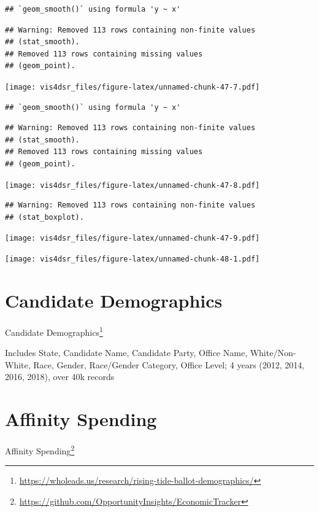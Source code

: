 \documentclass[
]{krantz}
\renewcommand{\href}[2]{#2\footnote{\url{#1}}}
\begin{document}
\begin{verbatim}
## `geom_smooth()` using formula 'y ~ x'
\end{verbatim}

\begin{verbatim}
## Warning: Removed 113 rows containing non-finite values
## (stat_smooth).
## Removed 113 rows containing missing values
## (geom_point).
\end{verbatim}

\texttt{[image: vis4dsr\_files/figure-latex/unnamed-chunk-47-7.pdf]}

\begin{verbatim}
## `geom_smooth()` using formula 'y ~ x'
\end{verbatim}

\begin{verbatim}
## Warning: Removed 113 rows containing non-finite values
## (stat_smooth).
## Removed 113 rows containing missing values
## (geom_point).
\end{verbatim}

\texttt{[image: vis4dsr\_files/figure-latex/unnamed-chunk-47-8.pdf]}

\begin{verbatim}
## Warning: Removed 113 rows containing non-finite values
## (stat_boxplot).
\end{verbatim}

\texttt{[image: vis4dsr\_files/figure-latex/unnamed-chunk-47-9.pdf]}

\texttt{[image: vis4dsr\_files/figure-latex/unnamed-chunk-48-1.pdf]}

\hypertarget{candidate-demographics}{%
\section*{Candidate Demographics}\label{candidate-demographics}}


\href{https://wholeads.us/research/rising-tide-ballot-demographics/}{Candidate Demographics}

Includes State, Candidate Name, Candidate Party, Office Name, White/Non-White, Race, Gender, Race/Gender Category, Office Level; 4 years (2012, 2014, 2016, 2018), over 40k records

\hypertarget{affinity-spending}{%
\section*{Affinity Spending}\label{affinity-spending}}


\href{https://github.com/OpportunityInsights/EconomicTracker}{Affinity Spending}
\end{document}
